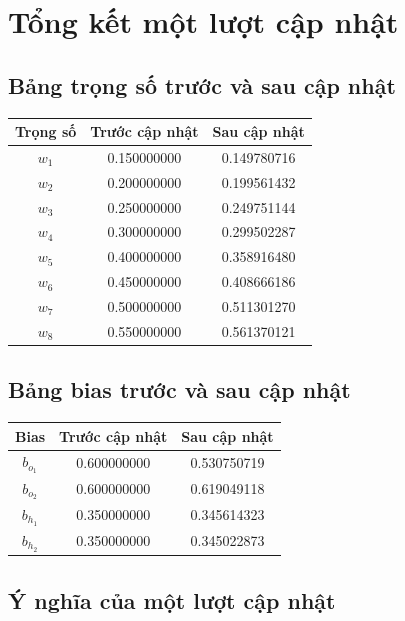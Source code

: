 \section{Tổng kết một lượt cập nhật}

\subsection{Bảng trọng số trước và sau cập nhật}

\begin{center}
\begin{tabular}{ccc}
\toprule
Trọng số & Trước cập nhật & Sau cập nhật \\
\midrule
$w_1$ & 0.150000000 & 0.149780716 \\
$w_2$ & 0.200000000 & 0.199561432 \\
$w_3$ & 0.250000000 & 0.249751144 \\
$w_4$ & 0.300000000 & 0.299502287 \\
$w_5$ & 0.400000000 & 0.358916480 \\
$w_6$ & 0.450000000 & 0.408666186 \\
$w_7$ & 0.500000000 & 0.511301270 \\
$w_8$ & 0.550000000 & 0.561370121 \\
\bottomrule
\end{tabular}
\end{center}

\subsection{Bảng bias trước và sau cập nhật}

\begin{center}
\begin{tabular}{ccc}
\toprule
Bias & Trước cập nhật & Sau cập nhật \\
\midrule
$b_{o_1}$ & 0.600000000 & 0.530750719 \\
$b_{o_2}$ & 0.600000000 & 0.619049118 \\
$b_{h_1}$ & 0.350000000 & 0.345614323 \\
$b_{h_2}$ & 0.350000000 & 0.345022873 \\
\bottomrule
\end{tabular}
\end{center}

\subsection{Ý nghĩa của một lượt cập nhật}

